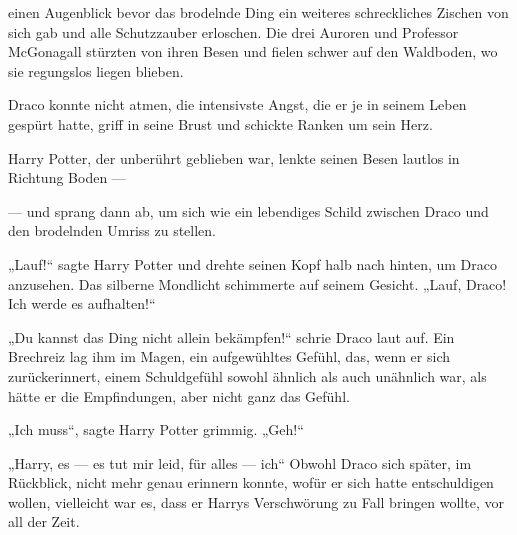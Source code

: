 \begin{em}
einen Augenblick bevor das brodelnde Ding ein weiteres schreckliches Zischen von sich gab und alle Schutzzauber erloschen. Die drei Auroren und Professor McGonagall stürzten von ihren Besen und fielen schwer auf den Waldboden, wo sie regungslos liegen blieben.

Draco konnte nicht atmen, die intensivste Angst, die er je in seinem Leben gespürt hatte, griff in seine Brust und schickte Ranken um sein Herz.

Harry Potter, der unberührt geblieben war, lenkte seinen Besen lautlos in Richtung Boden —

— und sprang dann ab, um sich wie ein lebendiges Schild zwischen Draco und den brodelnden Umriss zu stellen.

„Lauf!“ sagte Harry Potter und drehte seinen Kopf halb nach hinten, um Draco anzusehen. Das silberne Mondlicht schimmerte auf seinem Gesicht.
„Lauf, Draco! Ich werde es aufhalten!“

„Du kannst das Ding nicht allein bekämpfen!“ schrie Draco laut auf.
Ein Brechreiz lag ihm im Magen, ein aufgewühltes Gefühl, das, wenn er sich zurückerinnert, einem Schuldgefühl sowohl ähnlich als auch unähnlich war, als hätte er die Empfindungen, aber nicht ganz das Gefühl.

„Ich muss“, sagte Harry Potter grimmig.
„Geh!“

„Harry, es — es tut mir leid, für alles — ich“
Obwohl Draco sich später, im Rückblick, nicht mehr genau erinnern konnte, wofür er sich hatte entschuldigen wollen, vielleicht war es, dass er Harrys Verschwörung zu Fall bringen wollte, vor all der Zeit.


\end{em}
